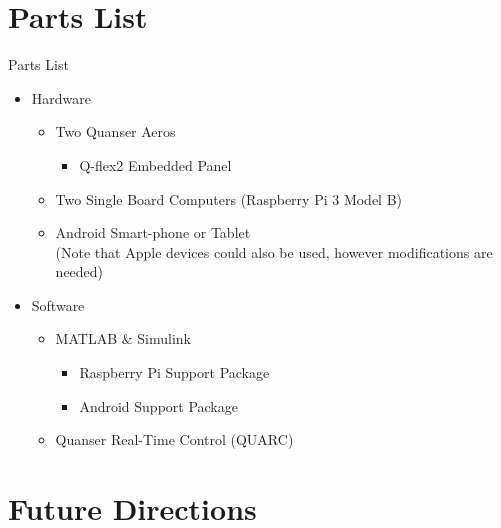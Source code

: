 \documentclass{beamer}
\begin{document}

\section{Parts List}

\begin{frame}{Parts List}{}

  \begin{itemize}
      \item Hardware
      \begin{itemize}
        \item Two Quanser Aeros
            \begin{itemize}
                \item Q-flex2 Embedded Panel
            \end{itemize}
        \item Two Single Board Computers (Raspberry Pi 3 Model B)
        \item Android Smart-phone or Tablet\\
        (Note that Apple devices could also be used, however modifications are needed)
      \end{itemize}
      \item Software
      \begin{itemize}
          \item MATLAB \& Simulink
          \begin{itemize}
            \item Raspberry Pi Support Package
            \item Android Support Package
          \end{itemize}
          \item Quanser Real-Time Control (QUARC)
      \end{itemize}
  \end{itemize}
\end{frame}




\section{Future Directions}
\end{document}
